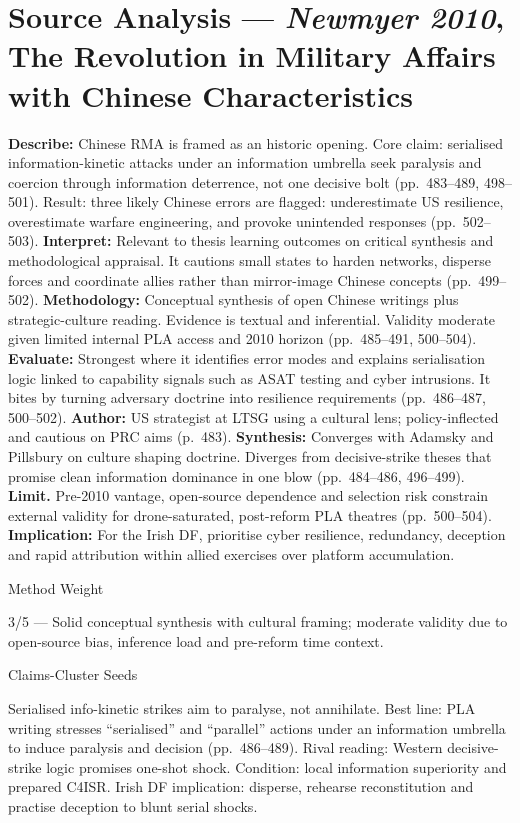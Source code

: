 \section*{Source Analysis — \textit{Newmyer 2010}, The Revolution in Military Affairs with Chinese Characteristics}
\textbf{Describe:} Chinese RMA is framed as an historic opening. Core claim: serialised information-kinetic attacks under an information umbrella seek paralysis and coercion through information deterrence, not one decisive bolt (pp.~483–489, 498–501). Result: three likely Chinese errors are flagged: underestimate US resilience, overestimate warfare engineering, and provoke unintended responses (pp.~502–503).
\textbf{Interpret:} Relevant to thesis learning outcomes on critical synthesis and methodological appraisal. It cautions small states to harden networks, disperse forces and coordinate allies rather than mirror-image Chinese concepts (pp.~499–502).
\textbf{Methodology:} Conceptual synthesis of open Chinese writings plus strategic-culture reading. Evidence is textual and inferential. Validity moderate given limited internal PLA access and 2010 horizon (pp.~485–491, 500–504).
\textbf{Evaluate:} Strongest where it identifies error modes and explains serialisation logic linked to capability signals such as ASAT testing and cyber intrusions. It bites by turning adversary doctrine into resilience requirements (pp.~486–487, 500–502).
\textbf{Author:} US strategist at LTSG using a cultural lens; policy-inflected and cautious on PRC aims (p.~483).
\textbf{Synthesis:} Converges with Adamsky and Pillsbury on culture shaping doctrine. Diverges from decisive-strike theses that promise clean information dominance in one blow (pp.~484–486, 496–499).
\textbf{Limit.} Pre-2010 vantage, open-source dependence and selection risk constrain external validity for drone-saturated, post-reform PLA theatres (pp.~500–504).
\textbf{Implication:} For the Irish DF, prioritise cyber resilience, redundancy, deception and rapid attribution within allied exercises over platform accumulation.

Method Weight

3/5 — Solid conceptual synthesis with cultural framing; moderate validity due to open-source bias, inference load and pre-reform time context.

Claims-Cluster Seeds

Serialised info-kinetic strikes aim to paralyse, not annihilate.
Best line: PLA writing stresses “serialised” and “parallel” actions under an information umbrella to induce paralysis and decision (pp.~486–489). Rival reading: Western decisive-strike logic promises one-shot shock. Condition: local information superiority and prepared C4ISR. Irish DF implication: disperse, rehearse reconstitution and practise deception to blunt serial shocks.

